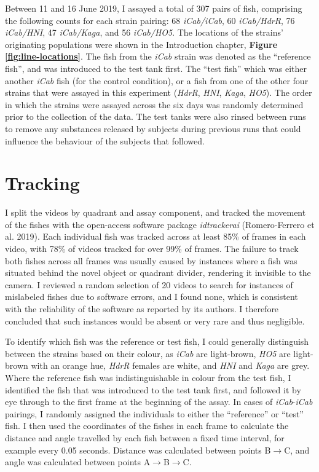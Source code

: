 \documentclass[
]{book}
\begin{document}
Between 11 and 16 June 2019, I assayed a total of 307 pairs of fish, comprising the following counts for each strain pairing: 68 \emph{iCab/iCab}, 60 \emph{iCab/HdrR}, 76 \emph{iCab/HNI}, 47 \emph{iCab/Kaga}, and 56 \emph{iCab/HO5}. The locations of the strains' originating populations were shown in the Introduction chapter, \textbf{Figure \ref{fig:line-locations}}. The fish from the \emph{iCab} strain was denoted as the ``reference fish'', and was introduced to the test tank first. The ``test fish'' which was either another \emph{iCab} fish (for the control condition), or a fish from one of the other four strains that were assayed in this experiment (\emph{HdrR}, \emph{HNI}, \emph{Kaga}, \emph{HO5}). The order in which the strains were assayed across the six days was randomly determined prior to the collection of the data. The test tanks were also rinsed between runs to remove any substances released by subjects during previous runs that could influence the behaviour of the subjects that followed.

\hypertarget{tracking}{%
\section{Tracking}\label{tracking}}

I split the videos by quadrant and assay component, and tracked the movement of the fishes with the open-access software package \emph{idtrackerai} (Romero-Ferrero et al. 2019). Each individual fish was tracked across at least 85\% of frames in each video, with 78\% of videos tracked for over 99\% of frames. The failure to track both fishes across all frames was usually caused by instances where a fish was situated behind the novel object or quadrant divider, rendering it invisible to the camera. I reviewed a random selection of 20 videos to search for instances of mislabeled fishes due to software errors, and I found none, which is consistent with the reliability of the software as reported by its authors. I therefore concluded that such instances would be absent or very rare and thus negligible.

To identify which fish was the reference or test fish, I could generally distinguish between the strains based on their colour, as \emph{iCab} are light-brown, \emph{HO5} are light-brown with an orange hue, \emph{HdrR} females are white, and \emph{HNI} and \emph{Kaga} are grey. Where the reference fish was indistinguishable in colour from the test fish, I identified the fish that was introduced to the test tank first, and followed it by eye through to the first frame at the beginning of the assay. In cases of \emph{iCab}-\emph{iCab} pairings, I randomly assigned the individuals to either the ``reference'' or ``test'' fish. I then used the coordinates of the fishes in each frame to calculate the distance and angle travelled by each fish between a fixed time interval, for example every 0.05 seconds. Distance was calculated between points B\(\rightarrow\)C, and angle was calculated between points A\(\rightarrow\)B\(\rightarrow\)C.
\end{document}
